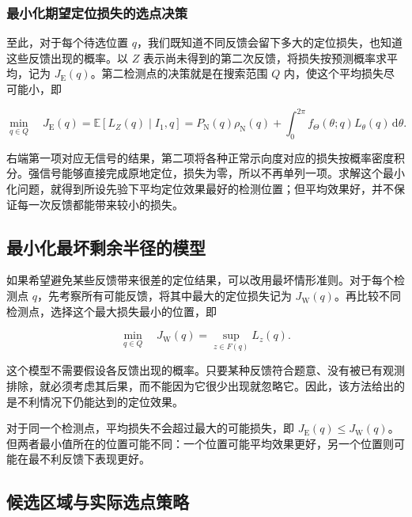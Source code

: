 \documentclass[UTF8,a4paper,zihao=-4,fontset=none]{ctexart}
\begin{document}
\subsubsection{最小化期望定位损失的选点决策}

至此，对于每个待选位置 \(q\)，我们既知道不同反馈会留下多大的定位损失，也知道这些反馈出现的概率。以 \(Z\) 表示尚未得到的第二次反馈，将损失按预测概率求平均，记为 \(J_{\mathrm E}(q)\)。第二检测点的决策就是在搜索范围 \(Q\) 内，使这个平均损失尽可能小，即

\begin{equation}
 \min_{q\in Q}\quad J_{\mathrm E}(q)=\mathbb E[L_Z(q)\mid I_1,q]
 =P_{\mathrm N}(q)\rho_{\mathrm N}(q)
 +\int_0^{2\pi}f_\Theta(\theta;q)L_\theta(q)\,\mathrm d\theta.
\label{eq:q2-pair-expected-objective}
\end{equation}

右端第一项对应无信号的结果，第二项将各种正常示向度对应的损失按概率密度积分。强信号能够直接完成原地定位，损失为零，所以不再单列一项。求解这个最小化问题，就得到所设先验下平均定位效果最好的检测位置；但平均效果好，并不保证每一次反馈都能带来较小的损失。

\subsection{最小化最坏剩余半径的模型}

如果希望避免某些反馈带来很差的定位结果，可以改用最坏情形准则。对于每个检测点 \(q\)，先考察所有可能反馈，将其中最大的定位损失记为 \(J_{\mathrm W}(q)\)。再比较不同检测点，选择这个最大损失最小的位置，即

\begin{equation}
 \min_{q\in Q}\quad J_{\mathrm W}(q)=\sup_{z\in F(q)}L_z(q).
\label{eq:q2-pair-worst-objective}
\end{equation}

这个模型不需要假设各反馈出现的概率。只要某种反馈符合题意、没有被已有观测排除，就必须考虑其后果，而不能因为它很少出现就忽略它。因此，该方法给出的是不利情况下仍能达到的定位效果。

对于同一个检测点，平均损失不会超过最大的可能损失，即 \(J_{\mathrm E}(q)\le J_{\mathrm W}(q)\)。但两者最小值所在的位置可能不同：一个位置可能平均效果更好，另一个位置则可能在最不利反馈下表现更好。

\subsection{候选区域与实际选点策略}
\end{document}
